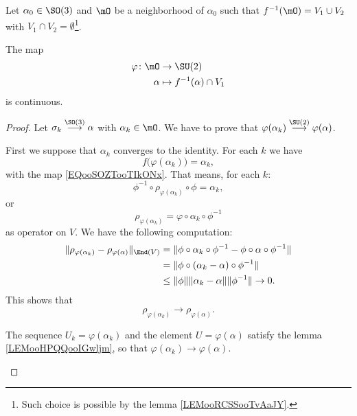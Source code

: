 \begin{proposition}        \label{PROPooHCVZooMOSzTm}
	Let \( \alpha_0\in \SO(3)\) and \( \mO\) be a neighborhood of \( \alpha_0\) such that \( f^{-1}(\mO)=V_1\cup V_2\) with \( V_1\cap V_2=\emptyset\)\footnote{Such choice is possible by the lemma \ref{LEMooRCSSooTvAaJY}.}.

	The map
	\begin{equation}
		\begin{aligned}
			\varphi\colon \mO & \to\SU(2)                      \\
			\alpha            & \mapsto f^{-1}(\alpha)\cap V_1
		\end{aligned}
	\end{equation}
	is continuous.
\end{proposition}

\begin{proof}
	Let \( \sigma_k\stackrel{\SO(3)}{\longrightarrow} \alpha\) with \( \alpha_k\in \mO\). We have to prove that \( \varphi(\alpha_k)\stackrel{\SU(2)}{\longrightarrow}\varphi(\alpha)\).
	\begin{subproof}
		First we suppose that \( \alpha_k\) converges to the identity. For each \( k\) we have
		\begin{equation}
			f\big( \varphi(\alpha_k) \big)=\alpha_k,
		\end{equation}
		with the map \eqref{EQooSOZTooTIkONx}. That means, for each \( k\):
		\begin{equation}
			\phi^{-1}\circ\rho_{\varphi(\alpha_k)}\circ \phi=\alpha_k,
		\end{equation}
		or
		\begin{equation}
			\rho_{\varphi(\alpha_k)}=\varphi\circ \alpha_k\circ\phi^{-1}
		\end{equation}
		as operator on \( V\).
		We have the following computation:
		\begin{subequations}
			\begin{align}
				\| \rho_{\varphi(\alpha_k)}-\rho_{\varphi(\alpha)} \|_{\End(V)} & =\| \phi\circ\alpha_k\circ\phi^{-1}-\phi\circ\alpha\circ\phi^{-1} \| \\
				                                                                & =\| \phi\circ(\alpha_k-\alpha)\circ\phi^{-1} \|                      \\
				                                                                & \leq \| \phi \|\| \alpha_k-\alpha \|\| \phi^{-1} \|\to0.
			\end{align}
		\end{subequations}
		This shows that
		\begin{equation}        \label{EQooCEFUooTCoczi}
			\rho_{\varphi(\alpha_k)}\to \rho_{\varphi(\alpha)}.
		\end{equation}

		\spitem[Conclusion]

		The sequence \( U_k=\varphi(\alpha_k)\) and the element \( U=\varphi(\alpha)\) satisfy the lemma \ref{LEMooHPQQooIGwljm}, so that \( \varphi(\alpha_k)\to \varphi(\alpha)\).
	\end{subproof}
\end{proof}

